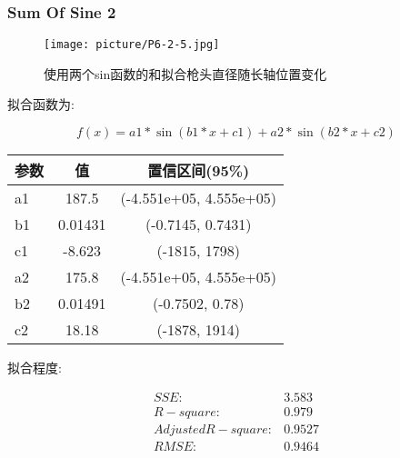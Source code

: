 \documentclass[UTF8]{ctexart}
\begin{document}
				\subsubsection{Sum Of Sine 2}
				\begin{figure}[h]
					\texttt{[image: picture/P6-2-5.jpg]}
					\caption{使用两个sin函数的和拟合枪头直径随长轴位置变化}
				\end{figure}
				\begin{flushleft}
					拟合函数为:
				\end{flushleft}
				\begin{center}
					$$  f(x) =  a1*\sin(b1*x+c1) + a2*\sin(b2*x+c2)$$		
					\begin{tabular}{|l|c|c|}
						\hline
						参数&值&置信区间(95\%)\\
						\hline
						a1 &       187.5&  (-4.551e+05, 4.555e+05)\\
						\hline
						b1 &     0.01431&  (-0.7145, 0.7431)\\
						\hline
						c1 &      -8.623&  (-1815, 1798)\\
						\hline
						a2 &       175.8&  (-4.551e+05, 4.555e+05)\\
						\hline
						b2 &     0.01491&  (-0.7502, 0.78)\\
						\hline
						c2 &       18.18&  (-1878, 1914)\\
						\hline													
					\end{tabular}
				\end{center}
				\begin{flushleft}
					拟合程度:
				\end{flushleft}
				\begin{center}
					$$
					\begin{matrix}
					SSE:& 3.583\\
					R-square:&0.979\\
					Adjusted R-square:&0.9527\\
					RMSE:&0.9464\\
					\end{matrix}
					$$
				\end{center}
\end{document}
